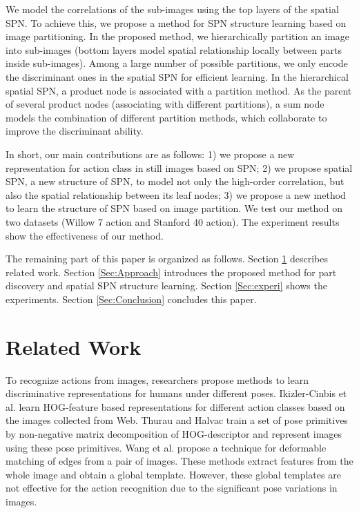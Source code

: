 \documentclass[journal]{IEEEtran}
\begin{document}
We model the correlations of the sub-images using the top layers of the spatial SPN. To achieve this, we propose a method for SPN structure learning based on image partitioning.
In the proposed method, we hierarchically partition an image into sub-images (bottom layers model spatial relationship locally between parts inside sub-images). Among a large number of possible partitions, we only encode the discriminant ones in the spatial SPN for efficient learning. In the hierarchical spatial SPN, a product node is associated with a partition method. As the parent of several product nodes (associating with different partitions), a sum node models the combination of different partition methods, which collaborate to improve the discriminant ability.



In short, our main contributions are as follows:
1) we propose a new representation for action class in still images based on SPN;
2) we propose spatial SPN, a new structure of SPN, to model not only the high-order correlation, but also the spatial relationship between its leaf nodes;
3) we propose a new method to learn the structure of SPN based on image partition.
We test our method on two datasets (Willow 7 action and Stanford 40 action). The experiment results show the effectiveness of our method.


The remaining part of this paper is organized as follows. Section \ref{Sec:Related_work} describes related work. Section \ref{Sec:Approach} introduces the proposed method for part discovery and spatial SPN structure learning. Section \ref{Sec:experi} shows the experiments. Section \ref{Sec:Conclusion} concludes this paper.



\section{Related Work}
\label{Sec:Related_work}

To recognize actions from images, researchers propose methods to learn discriminative representations for humans under different poses. Ikizler-Cinbis et al. \cite{ikizlercinbisICCV2009} learn HOG-feature based representations for different action classes based on the images collected from Web. Thurau and Halvac \cite{Thurau-HlavacPosePrimitivesCVPR2008} train a set of pose primitives by non-negative matrix decomposition of HOG-descriptor and represent images using these pose primitives. Wang et al. \cite{DBLP:conf/cvpr/WangJDLM06} propose a technique for deformable matching of edges from a pair of images. These methods \cite{ikizlercinbisICCV2009,Thurau-HlavacPosePrimitivesCVPR2008,DBLP:conf/cvpr/WangJDLM06} extract features from the whole image and obtain a global template. However, these global templates are not effective for the action recognition due to the significant pose variations in images.
\end{document}
